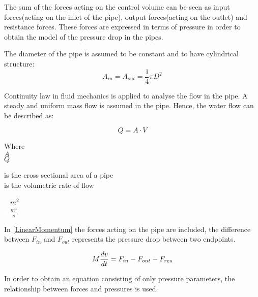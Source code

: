 The sum of the forces acting on the control volume can be seen as input forces(acting on the inlet of the pipe), output forces(acting on the outlet) and resistance forces.  
These forces are expressed in terms of pressure in order to obtain the model of the pressure drop in the pipes. 

The diameter of the pipe is assumed to be constant and to have cylindrical structure:
\begin{equation}
  A_{in} = A_{out} = \frac{1}{4}\pi D^{2}
\end{equation}

Continuity law in fluid mechanics is applied to analyse the flow in the pipe. \cite{Hunt_Fluidmechanics} A steady and uniform mass flow is assumed in the pipe. Hence, the water flow can be described as: 

\begin{equation}
  Q=A \cdot V
	\label{EquationOfContinuity}
\end{equation}

 \begin{minipage}[t]{0.20\textwidth}
Where\\
\hspace*{8mm} $A$ \\
\hspace*{8mm} $Q$ 
\end{minipage}
\begin{minipage}[t]{0.68\textwidth}
\vspace*{2mm}
is the cross sectional area of a pipe\\
is the volumetric rate of flow

\end{minipage}
\begin{minipage}[t]{0.10\textwidth}
\vspace*{2mm}
\textcolor{White}{te}$\unit{m^{2}}$\\
\textcolor{White}{te}$\unit{\frac{m^{3}}{s}}$
\end{minipage}

 In \eqref{LinearMomentum} the forces acting on the pipe are included, the difference between $F_{in}$ and $F_{out}$ represents the pressure drop 
 between two endpoints.

\begin{equation}
  M \frac{dv}{dt} = F_{in} - F_{out} - F_{res} \\
  \label{LinearMomentum}
\end{equation}

In order to obtain an equation consisting of only pressure parameters, the relationship between forces and pressures is used.



